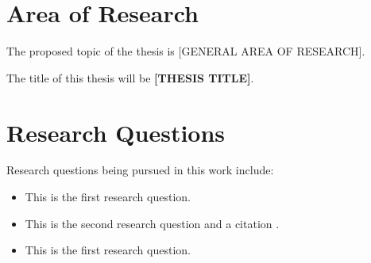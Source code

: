 \documentclass{article}
\begin{document}
%
\section{Area of Research}

The proposed topic of the thesis is [GENERAL AREA OF RESEARCH].  

The title of this thesis will be \textbf{[THESIS TITLE]}.

%
\section{Research Questions}

Research questions being pursued in this work include:

\begin{itemize}

\item This is the first research question.

\item This is the second research question and a citation \cite{mm2}.

\item This is the first research question.

\end{itemize}

%
\end{document}

